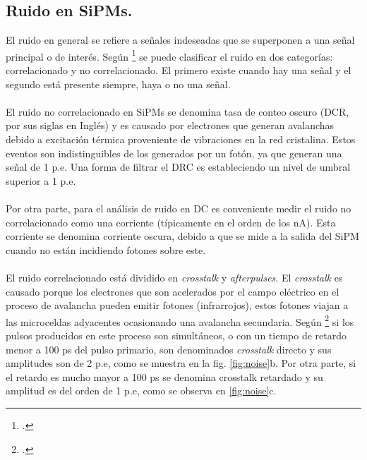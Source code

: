 \subsection{Ruido en SiPMs.}
El ruido en general se refiere a señales indeseadas que se superponen a una señal principal o de interés. Según \footcite{tomasi} se puede clasificar el ruido en dos categorías: correlacionado y no correlacionado. El primero existe cuando hay una señal y el segundo está presente siempre, haya o no una señal.\\ \\
El ruido no correlacionado en SiPMs se denomina tasa de conteo oscuro (DCR, por sus siglas en Inglés) y es causado por electrones que generan avalanchas debido a excitación térmica proveniente de vibraciones en la red cristalina. Estos eventos son indistinguibles de los generados por un fotón, ya que generan una señal de 1 p.e. Una forma de filtrar el DRC es estableciendo un nivel de umbral superior a 1 p.e.\\ \\
Por otra parte, para el análisis de ruido en DC es conveniente medir el ruido no correlacionado como una corriente (típicamente en el orden de los nA). Esta corriente se denomina corriente oscura, debido a que se mide a la salida del SiPM cuando no están incidiendo fotones sobre este.\\ \\
El ruido correlacionado está dividido en \textit{crosstalk} y \textit{afterpulses}. El \textit{crosstalk} es causado porque los electrones que  son acelerados por el campo eléctrico en el proceso de avalancha pueden emitir fotones (infrarrojos), estos fotones viajan a las microceldas adyacentes ocasionando una avalancha secundaria. Según \footcite{charct_noise} si los pulsos producidos en este proceso son simultáneos, o con un tiempo de retardo menor a 100 ps del pulso primario, son denominados \textit{crosstalk} directo y sus amplitudes son de 2 p.e, como se muestra en la fig. \ref{fig:noise}b. Por otra parte, si el retardo es mucho mayor a 100 ps se denomina  {crosstalk} retardado y su amplitud es del orden de 1 p.e, como se observa en \ref{fig:noise}c. 
